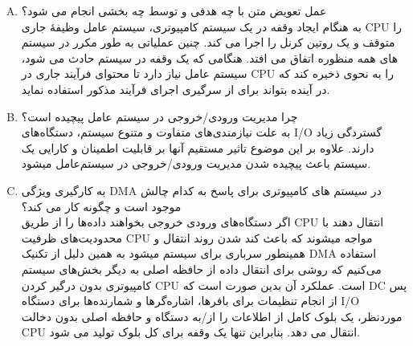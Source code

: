 \documentclass[]{article}
\begin{document}
\begin{enumerate}[(A)]
    \item عمل تعویض متن با چه هدفی و توسط چه بخشی انجام می شود؟ \\
    به هنگام ایجاد وقفه در یک سیستم کامپیوتری، سیستم عامل وظیفۀ جاری
    CPU
    را متوقف و یک روتین کرنل را اجرا می کند.
    چنین عملیاتی به طور مکرر در سیستم های همه منظوره اتفاق می افتد.
    هنگامی که یک وقفه در سیستم حادث می شود، سیستم عامل نیاز دارد تا محتوای فرآیند جاری در
    CPU
    را به نحوی ذخیره کند که در آینده بتواند برای از سرگیری اجرای فرآیند مذکور استفاده نماید.
    
    \item چرا مدیریت ورودی/خروجی در سیستم عامل پیچیده است؟ \\
    به علت نیازمندی‌های متفاوت و متنوع سیستم، دستگاه‌های I/O گستردگی زیاد دارند.
    علاوه بر این موضوع تاثیر مستقیم آنها بر قابلیت اطمینان و کارایی یک سیستم
    باعث پیچیده شدن مدیریت ورودی/خروجی در سیستم‌عامل میشود.

    \item به کارگیری ویژگی
    DMA
    در سیستم های کامپیوتری برای پاسخ به کدام چالش موجود است و چگونه کار می کند؟ \\
    اگر دستگاه‌های ورودی خروجی بخواهند داده‌ها را از طریق
    CPU
    انتقال دهند با محدودیت‌های ظرفیت
    CPU
    مواجه میشوند که باعث کند شدن روند انتقال و همینطور سرباری برای سیستم میشود
    به همین دلیل از تکنیک 
    DMA
    استفاده می‌کنیم که
    روشی برای انتقال داده از حافظه اصلی به دیگر بخش‌های سیستم کامپیوتری بدون درگیر کردن
    CPU است.
    عملکرد آن بدین صورت است که
    DC
    پس از انجام تنظيمات برای بافرها، اشاره‌گرها و شمارنده‌ها برای دستگاه
    I/O
    موردنظر، يک بلوک کامل از اطلاعات را از/به دستگاه و حافظه اصلی بدون دخالت
    CPU
    انتقال می دهد. بنابراين تنها يک وقفه برای کل بلوک توليد می شود.
\end{enumerate}
\end{document}

